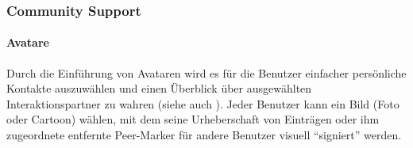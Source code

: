 \subsubsection{Community Support}

\paragraph{Avatare}
Durch die Einführung von Avataren wird es für die Benutzer einfacher persönliche Kontakte auszuwählen und einen Überblick über ausgewählten Interaktionspartner zu wahren (siehe auch \cite[S. 97ff.]{SCLU:PFCMI}). Jeder Benutzer kann ein Bild (Foto oder Cartoon) wählen, mit dem seine Urheberschaft von Einträgen oder ihm zugeordnete entfernte Peer-Marker für andere Benutzer visuell "`signiert"' werden.

